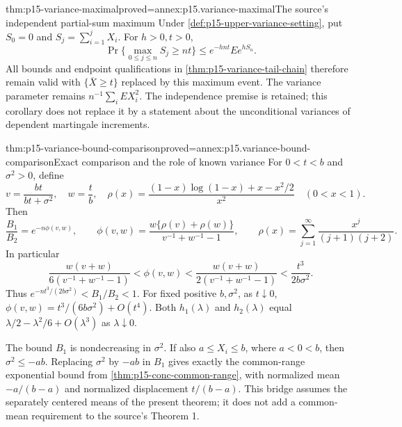 \begin{hbcorollary}{thm:p15-variance-maximal}{proved=annex:p15.variance-maximal}{The source's independent partial-sum maximum}
Under \cref{def:p15-upper-variance-setting}, put
\(S_0=0\) and \(S_j=\sum_{i=1}^jX_i\). For \(h>0,t>0\),
\[
 \Pr\{\max_{0\leq j\leq n}S_j\geq nt\}
 \leq e^{-hnt}Ee^{hS_n}.
\]
All bounds and endpoint qualifications in
\cref{thm:p15-variance-tail-chain} therefore remain valid with
\(\{\overline X\geq t\}\) replaced by this maximum event.
The variance parameter remains \(n^{-1}\sum_i EX_i^2\).
The independence premise is retained; this corollary does not replace
it by a statement about the unconditional variances of dependent
martingale increments.
\end{hbcorollary}

\begin{hbtheorem}{thm:p15-variance-bound-comparison}{proved=annex:p15.variance-bound-comparison}{Exact comparison and the role of known variance}
For \(0<t<b\) and \(\sigma^2>0\), define
\[
 v=\frac{bt}{bt+\sigma^2},\quad w=\frac tb,\quad
 \rho(x)=\frac{(1-x)\log(1-x)+x-x^2/2}{x^2}\quad(0<x<1).
\]
Then
\[
 \frac{B_1}{B_2}=e^{-n\phi(v,w)},\qquad
 \phi(v,w)=\frac{w\{\rho(v)+\rho(w)\}}{v^{-1}+w^{-1}-1},
 \qquad
 \rho(x)=\sum_{j=1}^{\infty}\frac{x^j}{(j+1)(j+2)}.
\]
In particular
\[
 \frac{w(v+w)}{6(v^{-1}+w^{-1}-1)}
 <\phi(v,w)<
 \frac{w(v+w)}{2(v^{-1}+w^{-1}-1)}
 <\frac{t^3}{2b\sigma^2}.
\]
Thus \(e^{-nt^3/(2b\sigma^2)}<B_1/B_2<1\).
For fixed positive \(b,\sigma^2\), as \(t\downarrow0\),
\(\phi(v,w)=t^3/(6b\sigma^2)+O(t^4)\).
Both \(h_1(\lambda)\) and \(h_2(\lambda)\) equal
\(\lambda/2-\lambda^2/6+O(\lambda^3)\) as \(\lambda\downarrow0\).

The bound \(B_1\) is nondecreasing in \(\sigma^2\).
If also \(a\leq X_i\leq b\), where \(a<0<b\), then
\(\sigma^2\leq-ab\). Replacing \(\sigma^2\) by \(-ab\) in \(B_1\)
gives exactly the common-range exponential bound from
\cref{thm:p15-conc-common-range}, with normalized mean
\(-a/(b-a)\) and normalized displacement \(t/(b-a)\).
This bridge assumes the separately centered means of the present theorem;
it does not add a common-mean requirement to the source's Theorem 1.
\end{hbtheorem}

